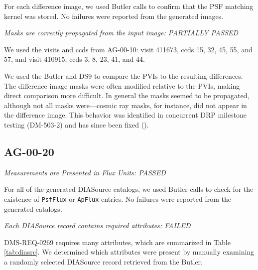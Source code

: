\documentclass[DM,lsstdraft,STR,toc]{lsstdoc}
\begin{document}
For each difference image, we used Butler calls to confirm that the PSF matching kernel was stored.  No failures were reported from the generated images.

\textit{Masks are correctly propagated from the input image: PARTIALLY PASSED}

We used the visits and ccds from AG-00-10:
visit 411673, ccds 15, 32, 45, 55, and 57, and
visit 410915, ccds 3,  8, 23, 41, and 44.

We used the Butler and DS9 to compare the PVIs to the resulting differences. 
The difference image masks were often modified relative to the PVIs, making 
direct comparison more difficult.  In general the masks seemed to be propagated,
although not all masks were---cosmic ray masks, for instance, did not appear 
in the difference image.  This behavior was identified in concurrent 
DRP milestone testing (DM-503-2) and has since been fixed ().


\subsection{AG-00-20}

\textit{Measurements are Presented in Flux Units: PASSED }

For all of the generated DIASource catalogs, we used Butler calls to check for
the existence of \texttt{PsfFlux} or \texttt{ApFlux} entries.  No failures were
reported from the generated catalogs.


\textit{Each DIASource record contains required attributes: FAILED}

DMS-REQ-0269 requires many attributes, which are summarized in Table
\ref{tab:diasrc}.  We determined which attributes were present by manually
examining a randomly selected DIASource record retrieved from the Butler.
\end{document}
